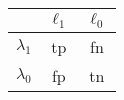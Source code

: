 \documentclass[10pt]{article}
\begin{document}
\pagecolor{tuftebg}

\begin{center}
    {\setlength{\extrarowheight}{2pt}
    \begin{tabular}{c|cc}
                      & $\ell_{1}$ & $\ell_{0}$ \\
        \hline
        $\lambda_{1}$ & tp         & fn         \\
        $\lambda_{0}$ & fp         & tn         \\
    \end{tabular}}
\end{center}

\end{document}
